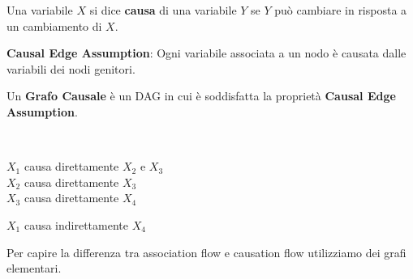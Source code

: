 Una variabile $X$ si dice \textbf{causa} di una variabile $Y$ se $Y$ può
cambiare in risposta a un cambiamento di $X$.

\textbf{Causal Edge Assumption}:
Ogni variabile associata a un nodo è causata dalle variabili dei nodi genitori.

Un \textbf{Grafo Causale} è un DAG in cui è soddisfatta la proprietà \textbf{Causal Edge Assumption}.

\begin{center}
  \begin{minipage}[c]{0.3\linewidth}
    \vspace{0pt}\
  \end{minipage}
  \begin{minipage}[c]{0.4\linewidth}
    $X_1$ causa direttamente $X_2$ e $X_3$\\
    $X_2$ causa direttamente $X_3$\\
    $X_3$ causa direttamente $X_4$

    \bigskip
    $X_1$ causa indirettamente $X_4$
  \end{minipage}
\end{center}
\bigskip

Per capire la differenza tra association flow e causation flow utilizziamo dei grafi elementari.

